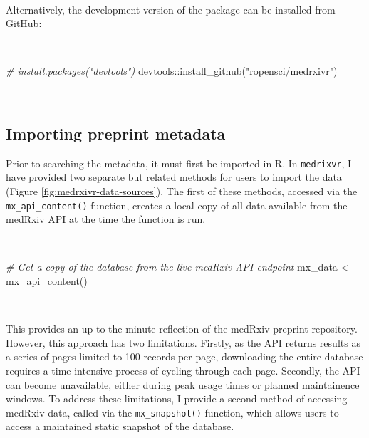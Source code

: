 \documentclass[a4paper, twoside]{templates/ociamthesis}
\newenvironment{Shaded}{\begin{snugshade}}{\end{snugshade}}
\newcommand{\CommentTok}[1]{\textcolor[rgb]{0.56,0.35,0.01}{\textit{#1}}}
\newcommand{\FunctionTok}[1]{\textcolor[rgb]{0.00,0.00,0.00}{#1}}
\newcommand{\NormalTok}[1]{#1}
\newcommand{\OtherTok}[1]{\textcolor[rgb]{0.56,0.35,0.01}{#1}}
\newcommand{\SpecialCharTok}[1]{\textcolor[rgb]{0.00,0.00,0.00}{#1}}
\newcommand{\StringTok}[1]{\textcolor[rgb]{0.31,0.60,0.02}{#1}}
\renewenvironment{Shaded}
{
  \vspace{4pt}%
  \begin{snugshade}%
}{%
  \end{snugshade}%
  \vspace{4pt}%
}
\begin{document}
~

Alternatively, the development version of the package can be installed from GitHub:

~

\begin{Shaded}
\begin{Highlighting}[]
\CommentTok{\# install.packages("devtools") }
\NormalTok{devtools}\SpecialCharTok{::}\FunctionTok{install\_github}\NormalTok{(}\StringTok{"ropensci/medrxivr"}\NormalTok{)}
\end{Highlighting}
\end{Shaded}

~

\hypertarget{importing-preprint-metadata}{%
\subsection{Importing preprint metadata}\label{importing-preprint-metadata}}

Prior to searching the metadata, it must first be imported in R. In \texttt{medrixvr}, I have provided two separate but related methods for users to import the data (Figure \ref{fig:medrxivr-data-sources}). The first of these methods, accessed via the \texttt{mx\_api\_content()} function, creates a local copy of all data available from the medRxiv API at the time the function is run.

~

\begin{Shaded}
\begin{Highlighting}[]
\CommentTok{\# Get a copy of the database from the live medRxiv API endpoint}
\NormalTok{mx\_data }\OtherTok{\textless{}{-}} \FunctionTok{mx\_api\_content}\NormalTok{()}
\end{Highlighting}
\end{Shaded}

~

This provides an up-to-the-minute reflection of the medRxiv preprint repository. However, this approach has two limitations. Firstly, as the API returns results as a series of pages limited to 100 records per page, downloading the entire database requires a time-intensive process of cycling through each page. Secondly, the API can become unavailable, either during peak usage times or planned maintainence windows. To address these limitations, I provide a second method of accessing medRxiv data, called via the \texttt{mx\_snapshot()} function, which allows users to access a maintained static snapshot of the database.
\end{document}
